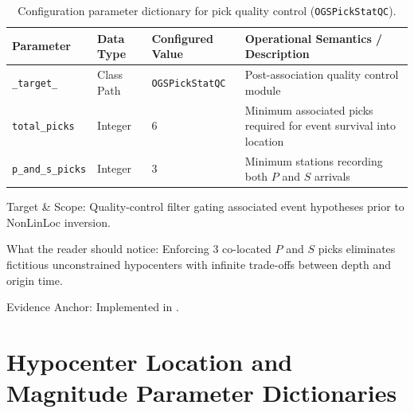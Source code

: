 \begin{landscape}
  \begin{table}[htbp]
    \centering
    \small
    \caption{Configuration parameter dictionary for pick quality
    control (\texttt{OGSPickStatQC}).}
    \label{tab:app_qc_dictionary}
    \begin{threeparttable}
      \begin{tabularx}{\linewidth}{l l l >{\raggedright\arraybackslash}X}
        \toprule
        \textbf{Parameter} & \textbf{Data Type} & \textbf{Configured
        Value} & \textbf{Operational Semantics / Description} \\
        \midrule
        \texttt{\_target\_} & Class Path & \texttt{OGSPickStatQC} &
        Post-association quality control module \\
        \texttt{total\_picks} & Integer & \num{6} & Minimum associated
        picks required
        for event survival into location \\
        \texttt{p\_and\_s\_picks} & Integer & \num{3} & Minimum
        stations recording
        both $P$ and $S$ arrivals \\
        \bottomrule
      \end{tabularx}
      \begin{tablenotes}[flushleft]
        \footnotesize
      \item Target \& Scope: Quality-control filter gating associated
        event hypotheses prior to \ac{NonLinLoc} inversion.
      \item What the reader should notice: Enforcing 3 co-located $P$
        and $S$ picks eliminates fictitious unconstrained hypocenters with
        infinite trade-offs between depth and origin time.
      \item Evidence Anchor: Implemented in .
      \end{tablenotes}
    \end{threeparttable}
  \end{table}
\end{landscape}

\section{Hypocenter Location and Magnitude Parameter Dictionaries}
\label{sec:app_loc_mag_params}

